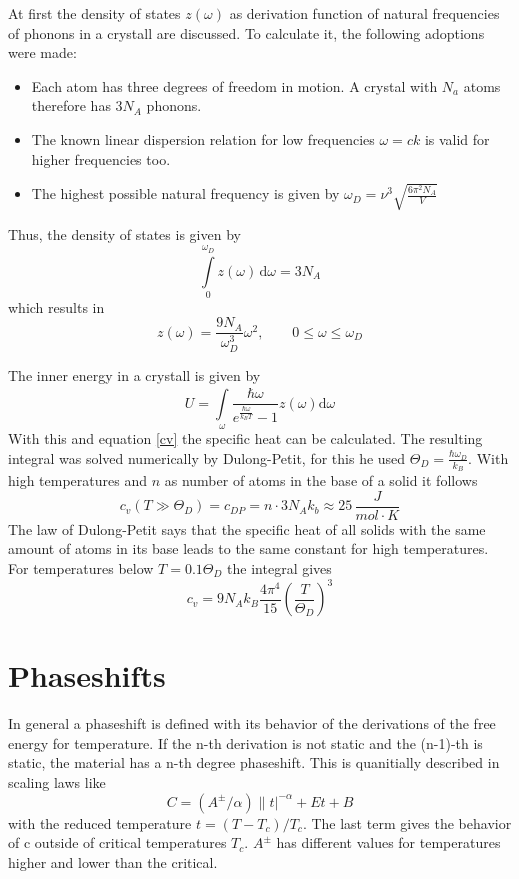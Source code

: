 \documentclass{include/thesisclass3}
\newcommand{\dd}{\text{d}}
\newcommand{\e}[1]{\,\si{#1}}
\begin{document}
At first the density of states $z(\omega)$ as derivation function of natural frequencies of phonons in a crystall are discussed.
To calculate it, the following adoptions were made:
\begin{itemize}
\item Each atom has three degrees of freedom in motion. A crystal with $N_a$ atoms therefore has $3N_A$ phonons.
\item The known linear dispersion relation for low frequencies $\omega=ck$ is valid for higher frequencies too.
\item The highest possible natural frequency is given by $\omega_D=\nu^3\sqrt{\frac{6 \pi ^2 N_A}{V}}$
\end{itemize}
Thus, the density of states is given by
\begin{equation}
\int \limits_{0}^{\omega_D} \! z(\omega) \, \dd\omega = 3N_A
\end{equation}
which results in
\begin{equation}
z(\omega)= \frac{9N_A}{\omega_D^3}\omega^2,\qquad 0\leq  \omega \leq \omega_D
\end{equation}

The inner energy in a crystall is given by
\begin{equation}
U= \int \limits_{\omega}^{}\! \frac{\hbar \omega}{e^{\frac{\hbar \omega}{k_B T}}-1} z(\omega)\dd \omega
\end{equation}
With this and equation \ref{cv} the specific heat can be calculated. The resulting integral was solved numerically by Dulong-Petit, for this he used $\Theta_D=\frac{\hbar \omega_D}{k_B}$. With high temperatures and $n$ as number of atoms in the base of a solid it follows
\begin{equation}
c_v(T\gg\Theta_D)=c_{DP}=n\cdot 3N_Ak_b\approx 25\e{\frac{J}{mol\cdot K}}
\end{equation}
The law of Dulong-Petit says that the specific heat of all solids with the same amount of atoms in its base leads to the same constant for high temperatures. For temperatures below  $T=0.1\Theta_D$ the integral gives
\begin{equation}
c_v=9N_Ak_B\frac{4\pi^4}{15}\left(\frac{T}{\Theta_D} \right)^3
\end{equation}

\section{Phaseshifts}
In general a phaseshift is defined with its behavior of the derivations of the free energy for temperature. 
If the n-th derivation is not static and the (n-1)-th is static, the material has a n-th degree phaseshift. 
This is quanitially described in scaling laws like
\begin{equation}
C=(A^{\pm}/\alpha)\|t|^{-\alpha}+Et+B
\label{phase}
\end{equation}
with the reduced temperature $t=(T-T_c)/T_c$. The last term gives the behavior of c outside of critical temperatures $T_c$. $A^{\pm}$ has different values for temperatures higher and lower than the critical. 
\end{document}

